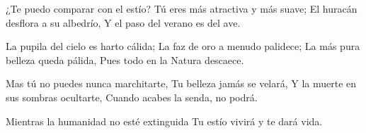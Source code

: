 \startlanguage[es]
\startlines
¿Te puedo comparar con el estío?
Tú eres más atractiva y más suave;
El huracán desflora a su albedrío,
Y el paso del verano es del ave.

La pupila del cielo es harto cálida;
La faz de oro a menudo palidece;
La más pura belleza queda pálida,
Pues todo en la Natura descaece.

Mas tú no puedes nunca marchitarte,
Tu belleza jamás se velará,
Y la muerte en sus sombras ocultarte,
Cuando acabes la senda, no podrá.

Mientras la humanidad no esté extinguida
Tu estío vivirá y te dará vida.
\stoplines
\stoplanguage
